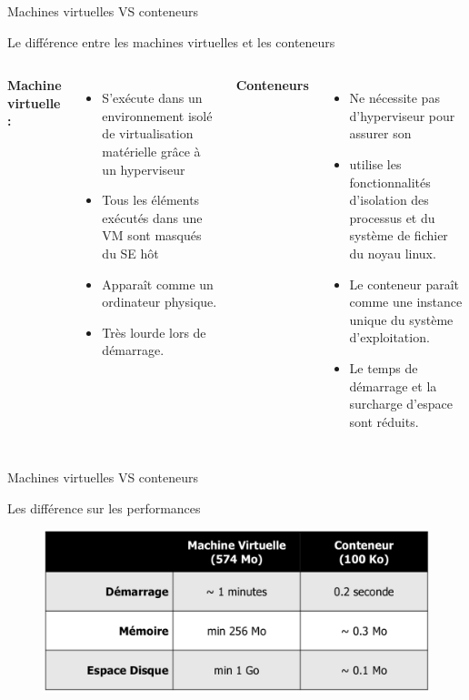 \documentclass{beamer}
\begin{document}
\begin{frame}{Machines virtuelles VS conteneurs}
    \begin{center}  Le différence entre les machines virtuelles et les conteneurs \end{center}
    \begin{columns}
        \textbf{ Machine virtuelle :} 
        \begin{itemize}
            \item S’exécute dans un environnement isolé de virtualisation 
                matérielle grâce à un hyperviseur 
            \item Tous les éléments exécutés dans une VM sont
                masqués du SE hôt 
            \item Apparaît comme un ordinateur physique.
            \item Très lourde lors de démarrage.
        \end{itemize}
        \textbf{Conteneurs}
        \begin{itemize}
            \item Ne nécessite pas d’hyperviseur pour assurer son 
            \item utilise les fonctionnalités d’isolation des processus et du système de fichier du noyau linux.
            \item Le conteneur paraît comme une instance unique du système d’exploitation.
            \item Le temps de démarrage et la surcharge d'espace sont réduits. 
        \end{itemize}
    \end{columns}

\end{frame}

\begin{frame}{Machines virtuelles VS conteneurs}
    \begin{center}  Les différence sur les performances
    \end{center}
         \begin{figure}
            \begin{center}
                \includegraphics[width=1\textwidth]{performances.png}
            \end{center}
        \end{figure}
\end{frame}
\end{document}

